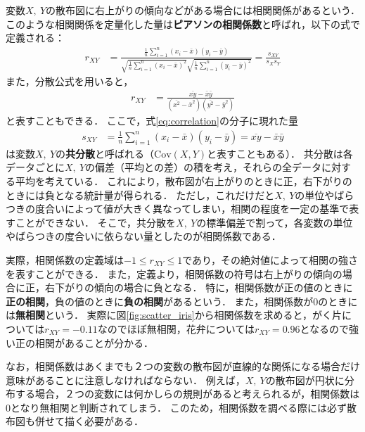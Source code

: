 %
変数$ X,\ Y $の散布図に右上がりの傾向などがある場合には相関関係があるという．
%
このような相関関係を定量化した量は\textbf{ピアソンの相関係数}と呼ばれ，以下の式で定義される：
%
\begin{align}
	r_{XY} &= \frac{\displaystyle\frac{1}{n} \sum_{i=1}^{n}(x_{i}-\bar{x})(y_{i}-\bar{y})}{\displaystyle\sqrt{\frac{1}{n} \sum_{i=1}^{n}(x_{i}-\bar{x})^{2}}\sqrt{\frac{1}{n} \sum_{i=1}^{n}(y_{i}-\bar{y})^{2}}} = \frac{s_{XY}}{s_{X}s_{Y}}
	\label{eq:correlation}
\end{align}
%
また，分散公式を用いると，
%
\begin{align}
	r_{XY} &= \frac{\overline{xy} - \bar{x}\bar{y}}{(\overline{x^{2}} - \bar{x}^{2})(\overline{y^{2}} - \bar{y}^{2})}
	\label{eq:correlation2}
\end{align}
%
と表すこともできる．
%
ここで，式\eqref{eq:correlation}の分子に現れた量
%
\begin{align}
	s_{XY} &= \frac{1}{n} \sum_{i=1}^{n}(x_{i}-\bar{x})(y_{i}-\bar{y}) = \overline{xy} - \bar{x}\bar{y}
	\label{eq:covariance}
\end{align}
%
は変数$ X,\ Y $の\textbf{共分散}と呼ばれる（$ \mathrm{Cov}(X, Y) $と表すこともある）．
%
共分散は各データごとに$ X,\ Y $の偏差（平均との差）の積を考え，それらの全データに対する平均を考えている．
%
これにより，散布図が右上がりのときに正，右下がりのときには負となる統計量が得られる．
%
ただし，これだけだと$ X,\ Y $の単位やばらつきの度合いによって値が大きく異なってしまい，相関の程度を一定の基準で表すことができない．
%
そこで，共分散を$ X,\ Y $の標準偏差で割って，各変数の単位やばらつきの度合いに依らない量としたのが相関係数である．
%

%
実際，相関係数の定義域は$ -1\leq r_{XY} \leq 1 $であり，その絶対値によって相関の強さを表すことができる．
%
また，定義より，相関係数の符号は右上がりの傾向の場合に正，右下がりの傾向の場合に負となる．
%
特に，相関係数が正の値のときに\textbf{正の相関}，負の値のときに\textbf{負の相関}があるという．
%
また，相関係数が0のときには\textbf{無相関}という．
%
実際に図\ref{fig:scatter_iris}から相関係数を求めると，がく片については$ r_{XY} = -0.11 $なのでほぼ無相関，花弁については$ r_{XY}=0.96 $となるので強い正の相関があることが分かる．
%

%
なお，相関係数はあくまでも２つの変数の散布図が直線的な関係になる場合だけ意味があることに注意しなければならない．
%
例えば，$ X,\ Y $の散布図が円状に分布する場合，２つの変数には何かしらの規則があると考えられるが，相関係数は0となり無相関と判断されてしまう．
%
このため，相関係数を調べる際には必ず散布図も併せて描く必要がある．
%

